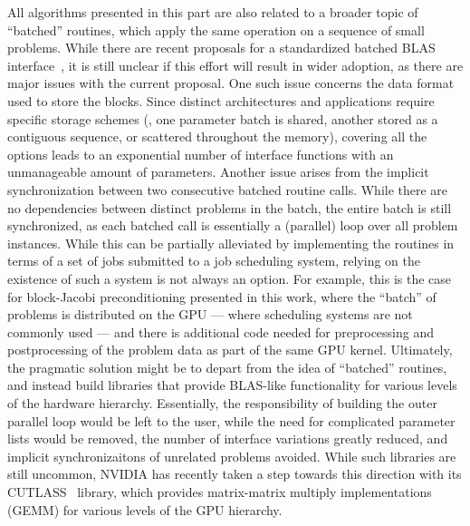All algorithms presented in this part are also related to a broader topic of
``batched'' routines, which apply the same operation on a sequence of small
problems. While there are recent proposals for a standardized batched BLAS
interface~\cite{batched-blas}, it is still unclear if this effort will result in
wider adoption, as there are major issues with the current proposal. One such
issue concerns the data format used to store the blocks. Since distinct
architectures and applications require specific storage schemes (\eg, one
parameter batch is shared, another stored as a contiguous sequence, or scattered
throughout the memory), covering all the options leads to an exponential number
of interface functions with an unmanageable amount of parameters. Another issue
arises from the implicit synchronization between two consecutive batched routine
calls. While there are no dependencies between distinct problems in the batch,
the entire batch is still synchronized, as each batched call is essentially a
(parallel) loop over all problem instances. While this can be partially
alleviated by implementing the routines in terms of a set of jobs submitted to a
job scheduling system, relying on the existence of such a system is not always
an option. For example, this is the case for block-Jacobi preconditioning
presented in this work, where the ``batch'' of problems is distributed on the
GPU --- where scheduling systems are not commonly used --- and there is
additional code needed for preprocessing and postprocessing of the problem data
as part of the same GPU kernel. Ultimately, the pragmatic solution might be to
depart from the idea of ``batched'' routines, and instead build libraries that
provide BLAS-like functionality for various levels of the hardware hierarchy.
Essentially, the responsibility of building the outer parallel loop would be
left to the user, while the need for complicated parameter lists would be
removed, the number of interface variations greatly reduced, and implicit
synchronizaitons of unrelated problems avoided. While such libraries are still
uncommon, NVIDIA has recently taken a step towards this direction with its
CUTLASS~\cite{cutlass} library, which provides matrix-matrix multiply
implementations (GEMM) for various levels of the GPU hierarchy.

